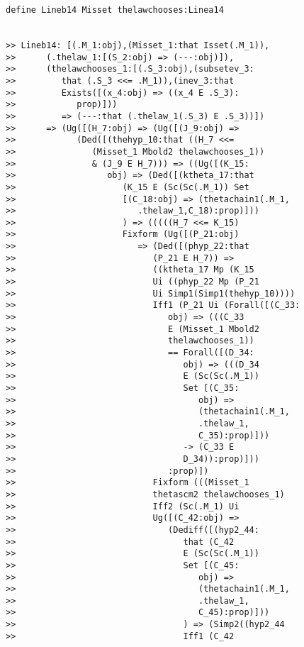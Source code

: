 \documentclass[12pt]{article}
\begin{document}
\begin{verbatim}
define Lineb14 Misset thelawchooses:Linea14


>> Lineb14: [(.M_1:obj),(Misset_1:that Isset(.M_1)),
>>      (.thelaw_1:[(S_2:obj) => (---:obj)]),
>>      (thelawchooses_1:[(.S_3:obj),(subsetev_3:
>>         that (.S_3 <<= .M_1)),(inev_3:that
>>         Exists([(x_4:obj) => ((x_4 E .S_3):
>>            prop)]))
>>         => (---:that (.thelaw_1(.S_3) E .S_3))])
>>      => (Ug([(H_7:obj) => (Ug([(J_9:obj) =>
>>            (Ded([(thehyp_10:that ((H_7 <<=
>>               (Misset_1 Mbold2 thelawchooses_1))
>>               & (J_9 E H_7))) => ((Ug([(K_15:
>>                  obj) => (Ded([(ktheta_17:that
>>                     (K_15 E (Sc(Sc(.M_1)) Set
>>                     [(C_18:obj) => (thetachain1(.M_1,
>>                        .thelaw_1,C_18):prop)]))
>>                     ) => (((((H_7 <<= K_15)
>>                     Fixform (Ug([(P_21:obj)
>>                        => (Ded([(phyp_22:that
>>                           (P_21 E H_7)) =>
>>                           ((ktheta_17 Mp (K_15
>>                           Ui ((phyp_22 Mp (P_21
>>                           Ui Simp1(Simp1(thehyp_10))))
>>                           Iff1 (P_21 Ui (Forall([(C_33:
>>                              obj) => (((C_33
>>                              E (Misset_1 Mbold2
>>                              thelawchooses_1))
>>                              == Forall([(D_34:
>>                                 obj) => (((D_34
>>                                 E (Sc(Sc(.M_1))
>>                                 Set [(C_35:
>>                                    obj) =>
>>                                    (thetachain1(.M_1,
>>                                    .thelaw_1,
>>                                    C_35):prop)]))
>>                                 -> (C_33 E
>>                                 D_34)):prop)]))
>>                              :prop)])
>>                           Fixform (((Misset_1
>>                           thetascm2 thelawchooses_1)
>>                           Iff2 (Sc(.M_1) Ui
>>                           Ug([(C_42:obj) =>
>>                              (Dediff([(hyp2_44:
>>                                 that (C_42
>>                                 E (Sc(Sc(.M_1))
>>                                 Set [(C_45:
>>                                    obj) =>
>>                                    (thetachain1(.M_1,
>>                                    .thelaw_1,
>>                                    C_45):prop)]))
>>                                 ) => (Simp2((hyp2_44
>>                                 Iff1 (C_42

\end{verbatim}
\end{document}
